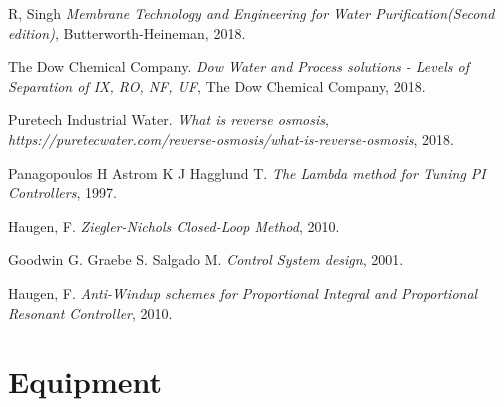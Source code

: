 \documentclass{LTHthesis}
\begin{document}
\medskip
\begin{thebibliography}{9}

R, Singh
\textit{Membrane Technology and Engineering for Water Purification(Second edition)},
 Butterworth-Heineman, 2018.
 
The Dow Chemical Company.
\textit{Dow Water and Process solutions - Levels of Separation of IX, RO, NF, UF}, 
The Dow Chemical Company, 2018.

 Puretech Industrial Water.
 \textit{What is reverse osmosis}, 
 \textit{https://puretecwater.com/reverse-osmosis/what-is-reverse-osmosis}, 
 2018.

 Panagopoulos H Astrom K J Hagglund T.
 \textit{The Lambda method for Tuning PI Controllers},
 1997.
 
 Haugen, F.
 \textit{Ziegler-Nichols Closed-Loop Method},
 2010.
 
 Goodwin G. Graebe S. Salgado M.
 \textit{Control System design},
 2001.
 
 Haugen, F.
 \textit{Anti-Windup schemes for Proportional Integral and Proportional Resonant Controller}, 
 2010.
 

\end{thebibliography}


\clearpage
\appendix
\chapter{Equipment} 
\label{A}

\end{document}
